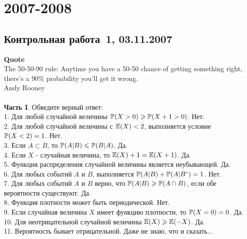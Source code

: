 \documentclass[pdftex,12pt,a4paper]{article}
\begin{document}
\section{2007-2008}
\subsection{Контрольная работа \No\,1, 03.11.2007}

\textbf{Quote}\\
The 50-50-90 rule: Anytime you have a 50-50 chance of getting something right, there's a 90\% probability you'll get it wrong. \\
Andy Rooney\\ \\

\textbf{Часть I}. Обведите верный ответ: \\

1. Для любой случайной величины $\P(X>0)\ge \P(X+1>0)$. Нет. \\

2. Для любой случайной величины с $\E(X)<2$, выполняется условие $\P(X<2)=1$. Нет. \\

3. Если $A\subset B$, то $\P(A|B)\le \P(B|A)$. Да. \\

4. Если  $X$  - случайная величина, то $\E(X)+1=\E(X+1)$. Да. \\

5. Функция распределения случайной величины является неубывающей. Да. \\

6. Для любых событий $A$ и $B$, выполняется $\P(A|B)+\P(A|B^{c})=1$. Нет. \\

7. Для любых событий  $A$  и  $B$  верно, что $\P(A|B)\ge \P(A\cap
B)$, если обе вероятности существуют. Да.  \\

8. Функция плотности может быть периодической. Нет. \\

9. Если случайная величина $X$ имеет функцию плотности, то $\P(X=0)=0$. Да.  \\

10. Для неотрицательной случайной величины $\E(X)\ge \E(-X)$. Да. \\

11. Вероятность бывает отрицательной. Даже не знаю, что и сказать... \\
\end{document}
